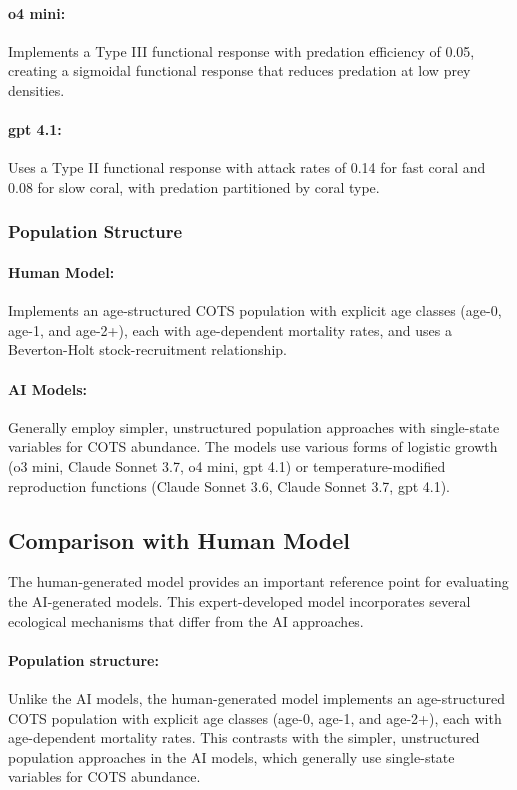 \paragraph{o4 mini:} Implements a Type III functional response with predation efficiency of 0.05, creating a sigmoidal functional response that reduces predation at low prey densities.

\paragraph{gpt 4.1:} Uses a Type II functional response with attack rates of 0.14 for fast coral and 0.08 for slow coral, with predation partitioned by coral type.

\subsubsection{Population Structure}
\label{subsubsec:population_structure}

\paragraph{Human Model:} Implements an age-structured COTS population with explicit age classes (age-0, age-1, and age-2+), each with age-dependent mortality rates, and uses a Beverton-Holt stock-recruitment relationship.

\paragraph{AI Models:} Generally employ simpler, unstructured population approaches with single-state variables for COTS abundance. The models use various forms of logistic growth (o3 mini, Claude Sonnet 3.7, o4 mini, gpt 4.1) or temperature-modified reproduction functions (Claude Sonnet 3.6, Claude Sonnet 3.7, gpt 4.1).

\subsection{Comparison with Human Model}
\label{subsec:human_comparison}

The human-generated model provides an important reference point for evaluating the AI-generated models. This expert-developed model incorporates several ecological mechanisms that differ from the AI approaches.

\paragraph{Population structure:}
Unlike the AI models, the human-generated model implements an age-structured COTS population with explicit age classes (age-0, age-1, and age-2+), each with age-dependent mortality rates. This contrasts with the simpler, unstructured population approaches in the AI models, which generally use single-state variables for COTS abundance.

